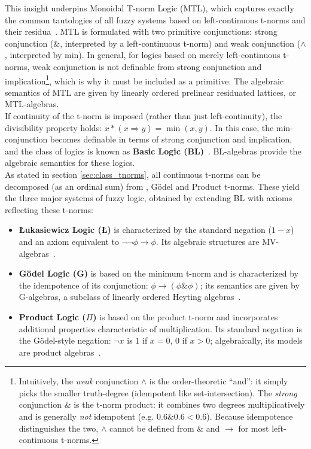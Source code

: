 This insight underpins Monoidal T-norm Logic (MTL), which captures exactly the common tautologies of all fuzzy systems based on left-continuous t-norms and their residua~\cite{GodoMonoidal}. MTL is formulated with two primitive conjunctions: strong conjunction ($\&$, interpreted by a left-continuous t-norm) and weak conjunction ($\wedge$, interpreted by min). In general, for logics based on merely left-continuous t-norms, weak conjunction is not definable from strong conjunction and implication\footnote{Intuitively, the \emph{weak} conjunction $\wedge$ is the order-theoretic ``and'': it simply picks the smaller truth-degree (idempotent like set-intersection). The \emph{strong} conjunction $\&$ is the t-norm product: it combines two degrees multiplicatively and is generally \emph{not} idempotent (e.g. $0.6\&0.6<0.6$). Because idempotence distinguishes the two, $\wedge$ cannot be defined from $\&$ and $\to$ for most left-continuous t-norms.}, which is why it must be included as a primitive. The algebraic semantics of MTL are given by linearly ordered prelinear residuated lattices, or MTL-algebras.\\

If continuity of the t-norm is imposed (rather than just left-continuity), the divisibility property holds: $x * (x \Rightarrow y) = \min(x, y)$. In this case, the min-conjunction becomes definable in terms of strong conjunction and implication, and the class of logics is known as \textbf{Basic Logic (BL)}~\cite[Sec. 2.2]{Hajek1998}. BL-algebras provide the algebraic semantics for these logics.\\

As stated in section \ref{sec:class_tnorms}, all continuous t-norms can be decomposed (as an ordinal sum) from \luka, Gödel and Product t-norms. These yield the three major systems of fuzzy logic, obtained by extending BL with axioms reflecting these t-norms:
\begin{itemize}
    \item \textbf{Łukasiewicz Logic (\L)} is characterized by the standard negation ($1-x$) and an axiom equivalent to $\lnot\lnot\phi \rightarrow \phi$. Its algebraic structures are MV-algebras~\cite[Ch. 3]{Hajek1998}.
    \item \textbf{Gödel Logic (G)} is based on the minimum t-norm and is characterized by the idempotence of its conjunction: $\phi \rightarrow (\phi \& \phi)$; its semantics are given by G-algebras, a subclass of linearly ordered Heyting algebras~\cite[Sec. 4.2]{Hajek1998}.
    \item \textbf{Product Logic ($\Pi$)} is based on the product t-norm and incorporates additional properties characteristic of multiplication. Its standard negation is the Gödel-style negation: $\lnot x$ is $1$ if $x=0$, $0$ if $x>0$; algebraically, its models are product algebras~\cite[Sec. 4.1]{Hajek1998}.
\end{itemize}

